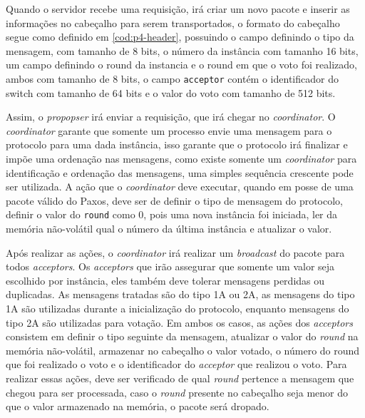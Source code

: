\documentclass[
    12pt,
    openright, 
    oneside,
    a4paper,
    french,
    english,
    brazil
    ]{facom-ufu-abntex2}
\theoremstyle{definition}
\begin{document}
Quando o servidor recebe uma requisição, irá criar um novo pacote e inserir as informações no
cabeçalho para serem transportados, o formato do cabeçalho segue como definido em \ref{cod:p4-header}, 
possuindo o campo definindo o tipo da mensagem, com tamanho de 8 bits, o número da instância com tamanho 16 bits,
um campo definindo o round da instancia e o round em que o voto foi realizado, ambos com tamanho de
8 bits, o campo \texttt{acceptor} contém o identificador do switch com tamanho de 64 bits e o valor do
voto com tamanho de 512 bits.



Assim, o \emph{propopser} irá enviar a requisição, que irá chegar no \emph{coordinator}. O \emph{coordinator} garante que
somente um processo envie uma mensagem para o protocolo para uma dada instância, isso garante 
que o protocolo irá finalizar e impõe uma ordenação nas mensagens, como existe somente um
\emph{coordinator} para identificação e ordenação das mensagens, uma simples sequência crescente pode ser
utilizada. A ação que o \emph{coordinator} deve executar, quando em posse de uma pacote válido do Paxos,
deve ser de definir o tipo de mensagem do protocolo, definir o valor do \texttt{round} como 0, pois
uma nova instância foi iniciada, ler da memória não-volátil qual o número da última instância e atualizar
o valor\cite{dang2016paxos}.



Após realizar as ações, o \emph{coordinator} irá realizar um \emph{broadcast} do pacote para todos \emph{acceptors}.
Os \emph{acceptors} que irão assegurar que somente um valor seja escolhido por instância, eles também deve tolerar
mensagens perdidas ou duplicadas. As mensagens tratadas são do tipo 1A ou 2A, as mensagens do
tipo 1A são utilizadas durante a inicialização do protocolo, enquanto mensagens do tipo 2A são utilizadas
para votação. Em ambos os casos, as ações dos \emph{acceptors} consistem em definir o tipo seguinte da mensagem,
atualizar o valor do \emph{round} na memória não-volátil, armazenar no cabeçalho o valor votado, o número do
round que foi realizado o voto e o identificador do \emph{acceptor} que realizou o voto. Para realizar
essas ações, deve ser verificado de qual \emph{round} pertence a mensagem que chegou para ser processada,
caso o \emph{round} presente no cabeçalho seja menor do que o valor armazenado na memória, o pacote será 
dropado\cite{dang2016paxos}.
\end{document}
